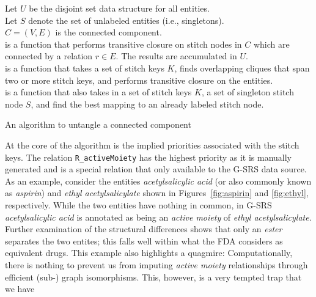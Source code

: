 \documentclass{bioinfo}
\begin{document}
\begin{methods}
\begin{algorithm}\label{algo:untangle}
\SetAlgoLined
\DontPrintSemicolon
Let $U$ be the disjoint set data structure for all entities.\\
Let $S$ denote the set of unlabeled entities (i.e., singletons).\\
$C=(V,E)$ is the connected component.\\
 is a function that performs transitive closure on
stitch nodes in $C$ which are connected by a relation $r\in E$. The results are
accumulated in $U$.\\
 is a function that takes a set of stitch keys
$K$, finds overlapping cliques that span two or more stitch keys,
and performs transitive closure on the entities.\\
 is a function that also takes in a set of
stitch keys $K$, a set of singleton stitch node $S$, and find the best
mapping to an already labeled stitch node.\\
\;
\;
\;
\;
\;
 \caption{An algorithm to untangle a connected component}
\end{algorithm}
At the core of the algorithm is the implied priorities associated with
the stitch keys. The relation \texttt{R\_activeMoiety} has the highest
priority as it is manually generated and is a special relation
that only available to the G-SRS data source. As an
example, consider the entities \emph{acetylsalicylic acid}
(or also commonly known as \emph{aspirin}) and \emph{ethyl acetylsalicylate}
shown in Figures~\ref{fig:aspirin} and \ref{fig:ethyl},
respectively. While the two entities have nothing in common, in G-SRS
\emph{acetylsalicylic acid} is annotated as being an \emph{active
moiety} of \emph{ethyl acetylsalicylate}. Further examination of the
structural differences shows that only an \emph{ester} separates the
two entites; this falls well within what the FDA considers as
equivalent drugs. This example also highlights a quagmire:
Computationally, there is nothing to prevent us from
imputing \emph{active moiety} relationships through efficient (sub-)
graph isomorphisms. This, however, is a very tempted trap that we have

\end{methods}
\end{document}
